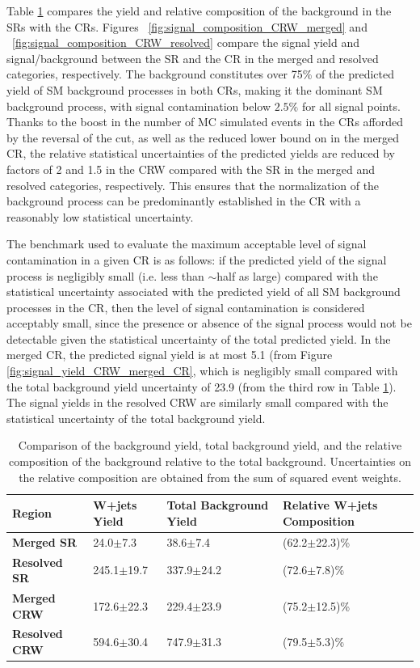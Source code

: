 Table \ref{tab:Wjets_composition_CRW} compares the yield and relative composition of the \wjets background in the SRs with the \wjets CRs. Figures ~\ref{fig:signal_composition_CRW_merged} and ~\ref{fig:signal_composition_CRW_resolved} compare the signal yield and signal/background between the SR and the \wjets CR in the merged and resolved categories, respectively. The \wjets background constitutes over 75\% of the predicted yield of SM background processes in both CRs, making it the dominant SM background process, with signal contamination below \(2.5\%\) for all signal points. Thanks to the boost in the number of MC simulated events in the CRs afforded by the reversal of the \DeltaR cut, as well as the reduced lower bound on \metsig in the merged CR, the relative statistical uncertainties of the predicted \wjets yields are reduced by factors of 2 and 1.5 in the CRW compared with the SR in the merged and resolved categories, respectively. This ensures that the normalization of the \wjets background process can be predominantly established in the \wjets CR with a reasonably low statistical uncertainty. 

The benchmark used to evaluate the maximum acceptable level of signal contamination in a given CR is as follows: if the predicted yield of the signal process is negligibly small (i.e. less than \(\sim\)half as large) compared with the statistical uncertainty associated with the predicted yield of all SM background processes in the CR, then the level of signal contamination is considered acceptably small, since the presence or absence of the signal process would not be detectable given the statistical uncertainty of the total predicted yield. In the merged \wjets CR, the predicted signal yield is at most 5.1 (from Figure \ref{fig:signal_yield_CRW_merged_CR}, which is negligibly small compared with the total background yield uncertainty of 23.9 (from the third row in Table \ref{tab:Wjets_composition_CRW}). The signal yields in the resolved CRW are similarly small compared with the statistical uncertainty of the total background yield.

\begin{table}[ht]
 \centering
 \footnotesize{
\caption{\label{tab:Wjets_composition_CRW} Comparison of the \wjets background yield, total background yield, and the relative composition of the \wjets background relative to the total background. Uncertainties on the relative composition are obtained from the sum of squared event weights.}
\begin{tabular}{l l l l}
\toprule
\textbf{Region} & \textbf{W+jets Yield} & \textbf{Total Background Yield} & \textbf{Relative W+jets Composition}\tabularnewline
\midrule
\midrule
\textbf{Merged SR} & 24.0\(\pm\)7.3 & 38.6\(\pm\)7.4 & (62.2\(\pm\)22.3)\%  \tabularnewline
\midrule
\textbf{Resolved SR} & 245.1\(\pm\)19.7 & 337.9\(\pm\)24.2 & (72.6\(\pm\)7.8)\% \tabularnewline
\midrule
\textbf{Merged CRW} & 172.6\(\pm\)22.3 & 229.4\(\pm\)23.9 & (75.2\(\pm\)12.5)\% \tabularnewline
\midrule
\textbf{Resolved CRW} & 594.6\(\pm\)30.4 & 747.9\(\pm\)31.3 & (79.5\(\pm\)5.3)\% \tabularnewline
\bottomrule
\end{tabular}}
\end{table}

